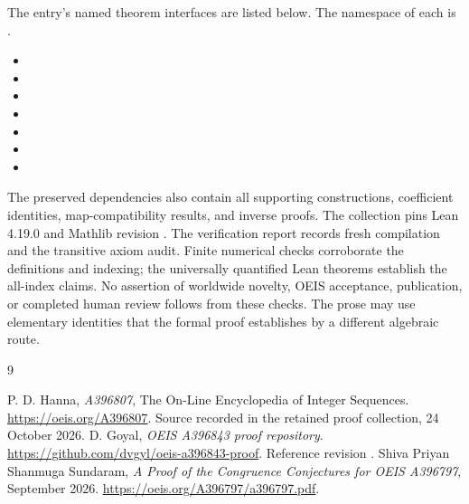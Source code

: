 \documentclass[11pt,a4paper]{article}
\theoremstyle{remark}\newtheorem{remark}[theorem]{Remark}
\begin{document}
The entry's named theorem interfaces are listed below. The namespace of
each is .
\begin{itemize}[leftmargin=1.5em,itemsep=1pt]
\item {}
\item {}
\item {}
\item {}
\item {}
\item {}
\item {}
\end{itemize}
The preserved dependencies also contain all supporting constructions,
coefficient identities, map-compatibility results, and inverse proofs.
The collection pins Lean 4.19.0 and Mathlib revision
.
The verification report records fresh compilation and the transitive axiom
audit. Finite numerical checks corroborate the definitions and indexing;
the universally quantified Lean theorems establish the all-index claims.
No assertion of worldwide novelty, OEIS acceptance, publication, or completed
human review follows from these checks. The prose may use elementary
identities that the formal proof establishes by a different algebraic route.

\begin{thebibliography}{9}\raggedright
{} P. D. Hanna, \emph{A396807}, The On-Line Encyclopedia of Integer
Sequences. \url{https://oeis.org/A396807}. Source recorded in the retained
proof collection, 24 October 2026.
 D. Goyal, \emph{OEIS A396843 proof repository}.
\url{https://github.com/dvgyl/oeis-a396843-proof}.
Reference revision .
 Shiva Priyan Shanmuga Sundaram,
\emph{A Proof of the Congruence Conjectures for OEIS A396797}, September 2026.
\url{https://oeis.org/A396797/a396797.pdf}.
\end{thebibliography}
\end{document}
